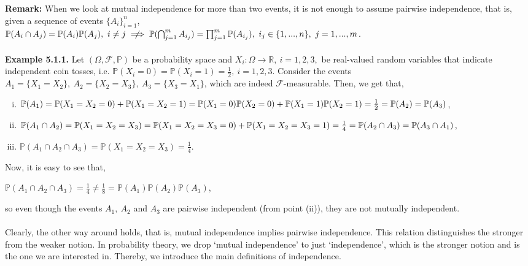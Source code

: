 \documentclass{article}
\begin{document}
\textbf{Remark:} When we look at mutual independence for more than two events, it is not enough to assume pairwise independence, that is, given a sequence of events $\{A_i\}_{i=1}^{n}$,\\ $\mathbb{P}(A_i \cap A_j) = \mathbb{P}(A_i)\mathbb{P}(A_j), \ i \neq j \centernot\implies \mathbb{P}(\bigcap_{j=1}^{m}A_{i_j}) = \prod_{j=1}^{m}\mathbb{P}(A_{i_j}), \ i_j \in \{1,...,n\}, \ j = 1,...,m$.\\\\
\textbf{Example 5.1.1.} Let $(\Omega,\mathcal{F},\mathbb{P})$ be a probability space and $X_i :\Omega\to\mathbb{R}, \ i=1,2,3,$ be real-valued random variables that indicate independent coin tosses, i.e. $\mathbb{P}(X_i = 0) = \mathbb{P}(X_i = 1) = \frac{1}{2}, \ i=1,2,3$. Consider the events $A_1 = \{X_1=X_2\}, \ A_2 = \{X_2=X_3\}, \ A_3 = \{X_3=X_1\}$, which are indeed $\mathcal{F}$-measurable. Then, we get that,
\begin{enumerate}[(i)]
	\item $\mathbb{P}(A_1) = \mathbb{P}(X_1=X_2=0) + \mathbb{P}(X_1 = X_2 = 1) = \mathbb{P}(X_1=0)\mathbb{P}(X_2=0) + \mathbb{P}(X_1=1)\mathbb{P}(X_2=1)\\ = \frac{1}{2} = \mathbb{P}(A_2) = \mathbb{P}(A_3)$,
	\item $\mathbb{P}(A_1 \cap A_2) = \mathbb{P}(X_1=X_2=X_3) =  \mathbb{P}(X_1=X_2=X_3=0) + \mathbb{P}(X_1=X_2=X_3=1)\\ = \frac{1}{4} = \mathbb{P}(A_2 \cap A_3) = \mathbb{P}(A_3 \cap A_1)$,
	\item $\mathbb{P}(A_1 \cap A_2 \cap A_3) = \mathbb{P}(X_1=X_2=X_3) = \frac{1}{4}$.
\end{enumerate}
Now, it is easy to see that,
\begin{center}
	$\mathbb{P}(A_1 \cap A_2 \cap A_3)= \frac{1}{4} \neq \frac{1}{8} = \mathbb{P}(A_1)\mathbb{P}(A_2)\mathbb{P}(A_3)$,
\end{center}
so even though the events $A_1, \ A_2$ and $A_3$ are pairwise independent (from point (ii)), they are not mutually independent.\\\\
Clearly, the other way around holds, that is, mutual independence implies pairwise independence. This relation distinguishes the stronger from the weaker notion. In probability theory, we drop ‘mutual independence’ to just ‘independence’, which is the stronger notion and is the one we are interested in. Thereby, we introduce the main definitions of independence.\\\\
\end{document}
